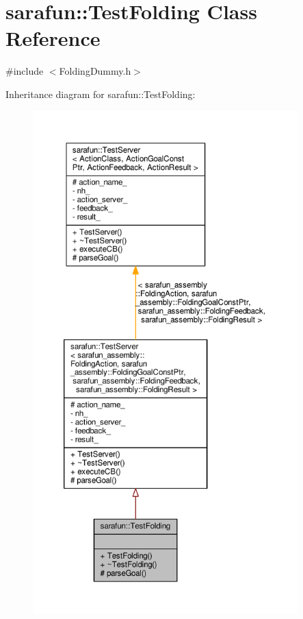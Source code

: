 \hypertarget{classsarafun_1_1TestFolding}{\section{sarafun\-:\-:Test\-Folding Class Reference}
\label{classsarafun_1_1TestFolding}
}


{\ttfamily \#include $<$Folding\-Dummy.\-h$>$}



Inheritance diagram for sarafun\-:\-:Test\-Folding\-:\nopagebreak
\begin{figure}[H]
\begin{center}
\leavevmode
\includegraphics[height=550pt]{d5/d07/classsarafun_1_1TestFolding__inherit__graph}
\end{center}
\end{figure}


